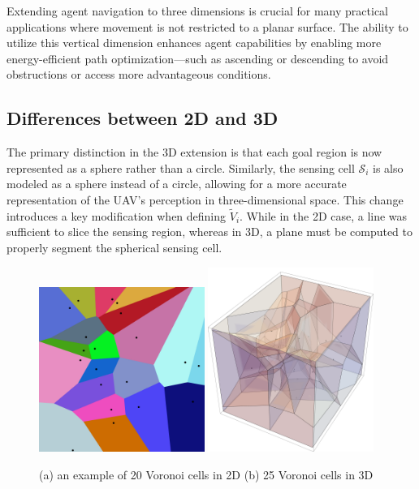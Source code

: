         Extending agent navigation to three dimensions is crucial for many practical applications where movement is not restricted to a planar surface.
        The ability to utilize this vertical dimension enhances agent capabilities by enabling more energy-efficient path optimization—such as ascending or descending to avoid obstructions or access more advantageous conditions.


    \subsection{Differences between 2D and 3D}
        The primary distinction in the 3D extension is that each goal region is now represented as a sphere rather than a circle.  
        Similarly, the sensing cell $\mathcal{S}_i$ is also modeled as a sphere instead of a circle, allowing for a more accurate representation of the \ac{UAV}'s perception in three-dimensional space.  
        This change introduces a key modification when defining $\tilde{V}_i$.
        While in the 2D case, a line was sufficient to slice the sensing region, whereas in 3D, a plane must be computed to properly segment the spherical sensing cell. 
        
        \begin{figure}[H]
            \centering
            \includegraphics[width=0.48\textwidth, height=0.48\textwidth]{./fig/diagrams/Euclidean_Voronoi_diagram.jpg}
            \includegraphics[width=0.48\textwidth, height=0.48\textwidth]{./fig/diagrams/Euclidian Voronoi diagram 3d.png}
            \caption{
                (a) an example of 20 Voronoi cells in 2D \cite{Voronoi2d} (b) 25 Voronoi cells in 3D \cite{Voronoi3d}
            }
            \label{fig:voronoi_diagrams}
        \end{figure}
    
